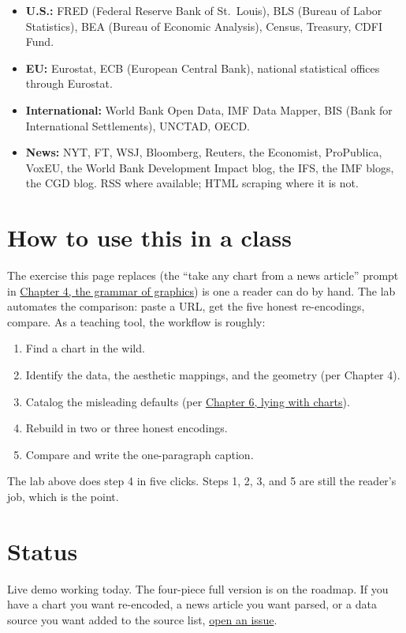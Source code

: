 \documentclass[
  letterpaper,
  11pt,
  twoside,
  openany]{scrbook}
\providecommand{\tightlist}{%
  \setlength{\itemsep}{0pt}\setlength{\parskip}{0pt}}
\begin{document}
\begin{itemize}
\tightlist
\item
  \textbf{U.S.:} FRED (Federal Reserve Bank of St.~Louis), BLS (Bureau
  of Labor Statistics), BEA (Bureau of Economic Analysis), Census,
  Treasury, CDFI Fund.
\item
  \textbf{EU:} Eurostat, ECB (European Central Bank), national
  statistical offices through Eurostat.
\item
  \textbf{International:} World Bank Open Data, IMF Data Mapper, BIS
  (Bank for International Settlements), UNCTAD, OECD.
\item
  \textbf{News:} NYT, FT, WSJ, Bloomberg, Reuters, the Economist,
  ProPublica, VoxEU, the World Bank Development Impact blog, the IFS,
  the IMF blogs, the CGD blog. RSS where available; HTML scraping where
  it is not.
\end{itemize}

\section{How to use this in a class}\label{how-to-use-this-in-a-class}

The exercise this page replaces (the ``take any chart from a news
article'' prompt in \hyperref[the-grammar-of-graphics]{Chapter 4, the
grammar of graphics}) is one a reader can do by hand. The lab automates
the comparison: paste a URL, get the five honest re-encodings, compare.
As a teaching tool, the workflow is roughly:

\begin{enumerate}
\def\labelenumi{\arabic{enumi}.}
\tightlist
\item
  Find a chart in the wild.
\item
  Identify the data, the aesthetic mappings, and the geometry (per
  Chapter 4).
\item
  Catalog the misleading defaults (per
  \hyperref[lying-with-charts]{Chapter 6, lying with charts}).
\item
  Rebuild in two or three honest encodings.
\item
  Compare and write the one-paragraph caption.
\end{enumerate}

The lab above does step 4 in five clicks. Steps 1, 2, 3, and 5 are still
the reader's job, which is the point.

\section{Status}\label{status}

Live demo working today. The four-piece full version is on the roadmap.
If you have a chart you want re-encoded, a news article you want parsed,
or a data source you want added to the source list,
\href{https://github.com/ihelfrich/pictures-of-inference/issues}{open an
issue}.


\backmatter
\end{document}
